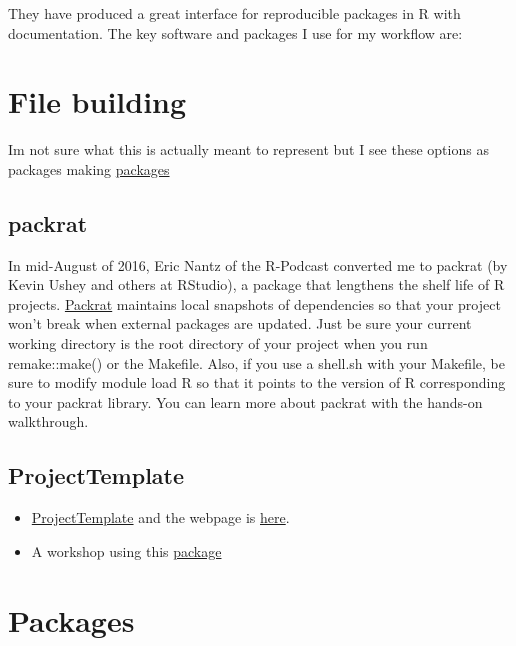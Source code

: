 \documentclass[
]{book}
\providecommand{\tightlist}{%
  \setlength{\itemsep}{0pt}\setlength{\parskip}{0pt}}
\begin{document}
They have produced a great interface for reproducible packages in R with documentation. The key software and packages I use for my workflow are:

\hypertarget{file-building}{%
\section{File building}\label{file-building}}

Im not sure what this is actually meant to represent but I see these options as packages making \href{https://wlandau.github.io/2016/06/14/workflow/}{packages}

\hypertarget{packrat}{%
\subsection{packrat}\label{packrat}}

In mid-August of 2016, Eric Nantz of the R-Podcast converted me to packrat (by Kevin Ushey and others at RStudio), a package that lengthens the shelf life of R projects. \href{https://rstudio.github.io/packrat/}{Packrat} maintains local snapshots of dependencies so that your project won't break when external packages are updated. Just be sure your current working directory is the root directory of your project when you run remake::make() or the Makefile. Also, if you use a shell.sh with your Makefile, be sure to modify module load R so that it points to the version of R corresponding to your packrat library. You can learn more about packrat with the hands-on walkthrough.

\hypertarget{projecttemplate}{%
\subsection{ProjectTemplate}\label{projecttemplate}}

\begin{itemize}
\tightlist
\item
  \href{https://cran.r-project.org/web/packages/ProjectTemplate/ProjectTemplate.pdf}{ProjectTemplate} and the webpage is \href{http://projecttemplate.net/}{here}.
\item
  A workshop using this \href{https://github.com/jeromyanglim/leuven2016rworkshop}{package}
\end{itemize}

\hypertarget{packages}{%
\section{Packages}\label{packages}}
\end{document}
